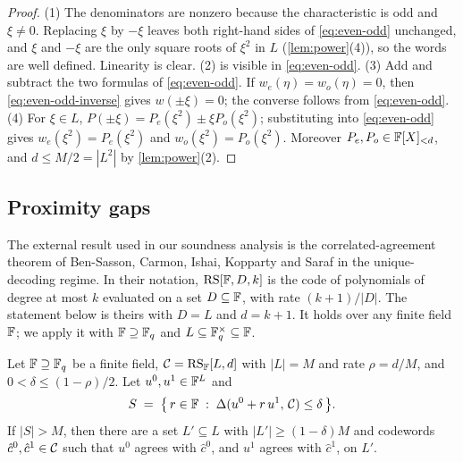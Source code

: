 \begin{proof}
(1) The denominators are nonzero because the characteristic is odd and $\xi \ne 0$. Replacing $\xi$ by $-\xi$ leaves both right-hand sides of \eqref{eq:even-odd} unchanged, and $\xi$ and $-\xi$ are the only square roots of $\xi^2$ in $L$ (\cref{lem:power}(4)), so the words are well defined. Linearity is clear.
(2) is visible in \eqref{eq:even-odd}.
(3) Add and subtract the two formulas of \eqref{eq:even-odd}. If $w_e(\eta) = w_o(\eta) = 0$, then \eqref{eq:even-odd-inverse} gives $w(\pm\xi) = 0$; the converse follows from \eqref{eq:even-odd}.
(4) For $\xi \in L$, $P(\pm\xi) = P_e(\xi^2) \pm \xi P_o(\xi^2)$; substituting into \eqref{eq:even-odd} gives $w_e(\xi^2) = P_e(\xi^2)$ and $w_o(\xi^2) = P_o(\xi^2)$. Moreover $P_e, P_o \in \mathbb{F}[X]_{<d}$, and $d \le M/2 = |L^2|$ by \cref{lem:power}(2).
\end{proof}

\subsection{Proximity gaps}\label{sec:prelim:gaps}

The external result used in our soundness analysis is the correlated-agreement theorem of Ben-Sasson, Carmon, Ishai, Kopparty and Saraf in the unique-decoding regime.
In their notation, $\mathrm{RS}[\mathbb{F}, D, k]$ is the code of polynomials of degree at most $k$ evaluated on a set $D \subseteq \mathbb{F}$, with rate $(k+1)/|D|$.
The statement below is theirs with $D = L$ and $d = k+1$.
It holds over any finite field $\mathbb{F}$; we apply it with $\mathbb{F} \supseteq \mathbb{F}_q$ and $L \subseteq \mathbb{F}_q^\times \subseteq \mathbb{F}$.

\begin{theorem}\label{thm:bciks}
Let $\mathbb{F} \supseteq \mathbb{F}_q$ be a finite field, $\mathcal{C} = \mathrm{RS}_{\mathbb{F}}[L,d]$ with $|L| = M$ and rate $\rho = d/M$, and $0 < \delta \le (1-\rho)/2$.
Let $u^0, u^1 \in \mathbb{F}^{L}$ and
\[
  S \;=\; \bigl\{\, r \in \mathbb{F} \;:\; \Delta(u^0 + r\, u^1,\, \mathcal{C}) \le \delta \,\bigr\}.
\]
If $|S| > M$, then there are a set $L' \subseteq L$ with $|L'| \ge (1-\delta)M$ and codewords $\hat c^0, \hat c^1 \in \mathcal{C}$ such that $u^0$ agrees with $\hat c^0$, and $u^1$ agrees with $\hat c^1$, on $L'$.
\end{theorem}
